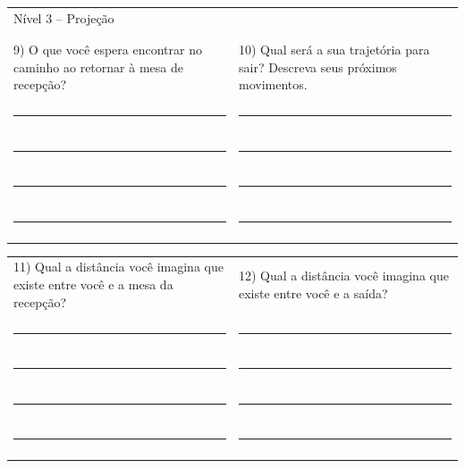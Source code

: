 \begin{table}[!htb]
\begin{tabular}{p{0.5\linewidth} p{0.5\linewidth}}
    \end{tabular}
    \begin{tabular}{p{0.5\linewidth} p{0.5\linewidth}}
        \large{Nível 3 – Projeção}  &\\
        & \\
        & \\
        9)	O que você espera encontrar no caminho ao retornar à mesa de recepção? & 10)	Qual será a sua trajetória para sair? Descreva seus próximos movimentos. \\
        & \\
        \rule{\linewidth}{.2mm} & \rule{\linewidth}{.2mm}\\
        & \\
        \rule{\linewidth}{.2mm} & \rule{\linewidth}{.2mm}\\
        & \\
        \rule{\linewidth}{.2mm} & \rule{\linewidth}{.2mm}\\
        & \\
        \rule{\linewidth}{.2mm} & \rule{\linewidth}{.2mm}\\
        & \\
\end{tabular}
    \begin{tabular}{p{0.5\linewidth} p{0.5\linewidth}}
        11)	Qual a distância você imagina que existe entre você e a mesa da recepção? & 12)	Qual a distância você imagina que existe entre você e a saída? \\
        & \\
        \rule{\linewidth}{.2mm} & \rule{\linewidth}{.2mm}\\
        & \\
        \rule{\linewidth}{.2mm} & \rule{\linewidth}{.2mm}\\
        & \\
        \rule{\linewidth}{.2mm} & \rule{\linewidth}{.2mm}\\
        & \\
        \rule{\linewidth}{.2mm} & \rule{\linewidth}{.2mm}\\
        & \\
    \end{tabular}
\end{table}
